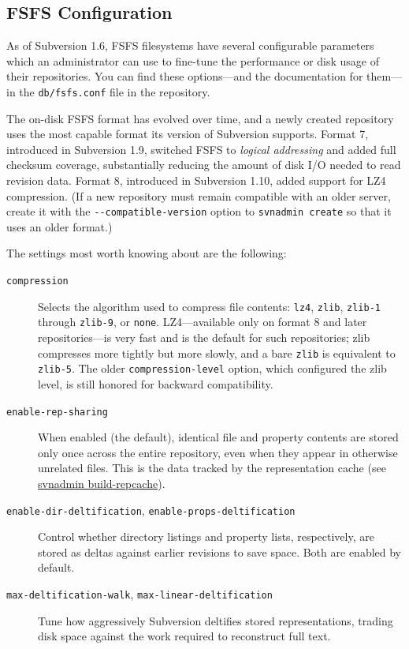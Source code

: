 \subsection{FSFS Configuration}\label{svn.reposadmin.create.fsfs}

As of Subversion 1.6, FSFS filesystems have several configurable
parameters which an administrator can use to fine-tune the performance
or disk usage of their repositories. You can find these options---and
the documentation for them---in the \texttt{db/fsfs.conf} file in the
repository.

The on-disk FSFS format has evolved over time, and a newly created
repository uses the most capable format its version of Subversion
supports. Format 7, introduced in Subversion 1.9, switched FSFS to
\emph{logical addressing} and added full checksum coverage,
substantially reducing the amount of disk I/O needed to read revision
data. Format 8, introduced in Subversion 1.10, added support for LZ4
compression. (If a new repository must remain compatible with an older
server, create it with the \texttt{-\/-compatible-version} option to
\texttt{svnadmin\ create} so that it uses an older format.)

The settings most worth knowing about are the following:

\begin{description}
\item[\texttt{compression}]
Selects the algorithm used to compress file contents:
\texttt{lz4}, \texttt{zlib}, \texttt{zlib-1} through \texttt{zlib-9}, or
\texttt{none}. LZ4---available only on format 8 and later
repositories---is very fast and is the default for such repositories;
zlib compresses more tightly but more slowly, and a bare \texttt{zlib} is
equivalent to \texttt{zlib-5}. The older \texttt{compression-level}
option, which configured the zlib level, is still honored for backward
compatibility.
\item[\texttt{enable-rep-sharing}]
When enabled (the default), identical file and property contents are
stored only once across the entire repository, even when they appear in
otherwise unrelated files. This is the data tracked by the representation
cache (see \hyperref[svn.ref.svnadmin.c.build-repcache]{svnadmin
build-repcache}).
\item[\texttt{enable-dir-deltification}, \texttt{enable-props-deltification}]
Control whether directory listings and property lists, respectively, are
stored as deltas against earlier revisions to save space. Both are
enabled by default.
\item[\texttt{max-deltification-walk}, \texttt{max-linear-deltification}]
Tune how aggressively Subversion deltifies stored representations,
trading disk space against the work required to reconstruct full text.
\end{description}

